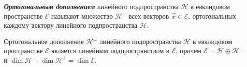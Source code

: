 \begin{definition}
    \textit{\textbf{Ортогональным дополнением}} линейного подпространства $\mathcal{H}$ в евклидовом пространстве $\mathcal{E}$ называют множество $\mathcal{H}^\perp$ всех векторов $\vec{x} \in \mathcal{E}$, ортогональных каждому вектору линейного подпространства $\mathcal{H}$.
\end{definition}

\begin{theorem}
    Ортогональное дополнение $\mathcal{H}^\perp$ линейного подпространства $\mathcal{H}$ в евклидовом пространстве $\mathcal{E}$ является линейным подпространством в $\mathcal{E}$, причем $\mathcal{E} = \mathcal{H} \oplus \mathcal{H}^\perp$ и $\dim \mathcal{H} + \dim \mathcal{H}^\perp = \dim \mathcal{E}$.
\end{theorem}

